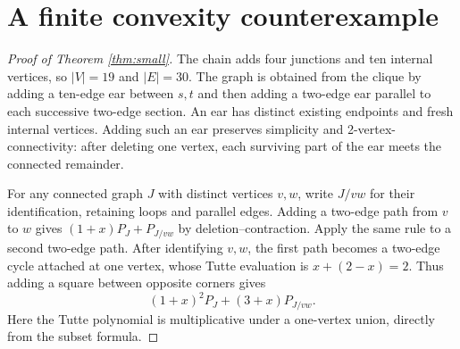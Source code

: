 \documentclass[11pt]{article}
\begin{document}
\section{A finite convexity counterexample}
\begin{proof}[Proof of Theorem \ref{thm:small}]
The chain adds four junctions and ten internal vertices, so $|V|=19$ and $|E|=30$. The graph is obtained from the clique by adding a ten-edge ear between $s,t$ and then adding a two-edge ear parallel to each successive two-edge section. An ear has distinct existing endpoints and fresh internal vertices. Adding such an ear preserves simplicity and 2-vertex-connectivity: after deleting one vertex, each surviving part of the ear meets the connected remainder. 

For any connected graph $J$ with distinct vertices $v,w$, write $J/vw$ for their identification, retaining loops and parallel edges. Adding a two-edge path from $v$ to $w$ gives $(1+x)P_J+P_{J/vw}$ by deletion--contraction. Apply the same rule to a second two-edge path. After identifying $v,w$, the first path becomes a two-edge cycle attached at one vertex, whose Tutte evaluation is $x+(2-x)=2$. Thus adding a square between opposite corners gives
\begin{equation}\label{eq:square}
(1+x)^2P_J+(3+x)P_{J/vw}.
\end{equation}
Here the Tutte polynomial is multiplicative under a one-vertex union, directly from the subset formula.


\end{proof}
\end{document}
